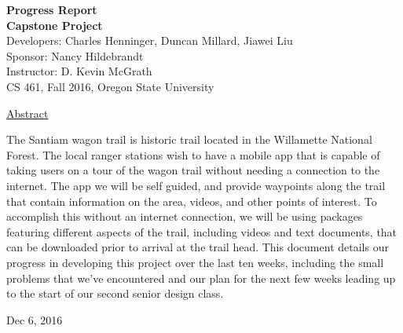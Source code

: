 \documentclass[letterpaper, 10pt,titlepage]{article}
\newcommand\tab[1][1cm]{\hspace*{#1}}
\begin{document}
\begin{titlepage}
\begin{center}
    \Huge
    \textbf{Progress Report}\\
    \textbf{Capstone Project}\\
    \vspace{1.0cm}
    \large
    Developers: Charles Henninger, Duncan Millard, Jiawei Liu\\
    Sponsor: Nancy Hildebrandt\\
    \vspace{1.5cm}
    \large
    Instructor: D. Kevin McGrath\\

    \large
    CS 461, Fall 2016, Oregon State University\\    

    \vspace{3.2cm}

    \large
    \underline{Abstract}\\
    \vspace{0.3cm}
    \end{center}
    \large

    \tab The Santiam wagon trail is historic trail located in the Willamette National Forest. The local ranger stations wish to have a mobile app that is capable of taking users on a tour of the wagon trail without needing a connection to the internet. The app we will be self guided, and provide waypoints along the trail that contain information on the area, videos, and other points of interest. To accomplish this without an internet connection, we will be using packages featuring different aspects of the trail, including videos and text documents, that can be downloaded prior to arrival at the trail head. This document details our progress in developing this project over the last ten weeks, including the small problems that we’ve encountered and our plan for the next few weeks leading up to the start of our second senior design class.
    
    \vspace{0.8cm}
    \vfill
    
\begin{center}    
    Dec 6, 2016

\end{center}
\end{titlepage}


\tableofcontents
\newpage
\end{document}
